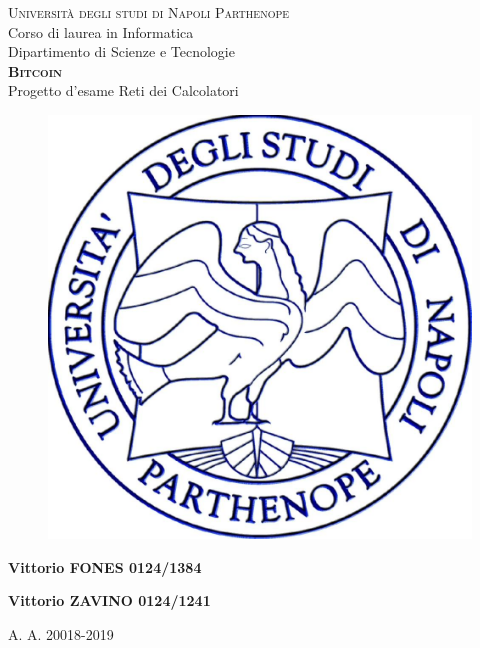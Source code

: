 \documentclass[a4paper,10pt]{report}
\begin{document}
  \thispagestyle{empty}
  \enlargethispage{60mm}
  \begin{center}
    \Large{\textsc{Università degli studi di Napoli Parthenope}}\\
    \large{Corso di laurea in Informatica}\\
    \large{Dipartimento di Scienze e Tecnologie}\\
    \vspace{25mm}
    \textbf{\Huge{\textsc{Bitcoin}}}\\
    \Large{Progetto d'esame Reti dei Calcolatori}\\
    \vspace{7mm}
    \begin{figure}[h]
    	\begin{center}
    	   \includegraphics[scale=0.2]{parthenope.jpeg}
      \end{center}
    \end{figure}
    \vspace{35mm}
    \textbf{Vittorio FONES 0124/1384}
    
    \textbf{Vittorio ZAVINO 0124/1241}\\
    \vspace{5mm}

    \large{A. A. 20018-2019}
  \end{center}
\end{document}
